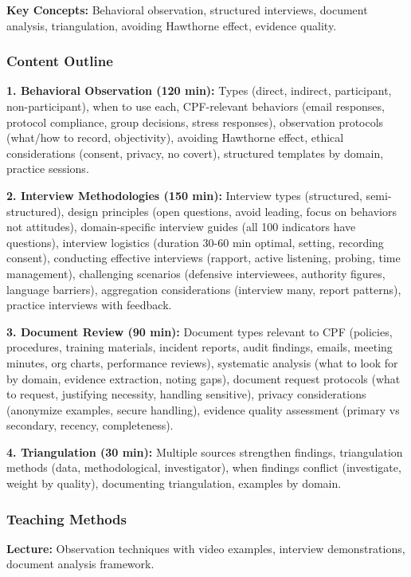 \documentclass[11pt,a4paper]{article}
\begin{document}
\textbf{Key Concepts:} Behavioral observation, structured interviews, document analysis, triangulation, avoiding Hawthorne effect, evidence quality.

\subsubsection{Content Outline}

\textbf{1. Behavioral Observation (120 min):} Types (direct, indirect, participant, non-participant), when to use each, CPF-relevant behaviors (email responses, protocol compliance, group decisions, stress responses), observation protocols (what/how to record, objectivity), avoiding Hawthorne effect, ethical considerations (consent, privacy, no covert), structured templates by domain, practice sessions.

\textbf{2. Interview Methodologies (150 min):} Interview types (structured, semi-structured), design principles (open questions, avoid leading, focus on behaviors not attitudes), domain-specific interview guides (all 100 indicators have questions), interview logistics (duration 30-60 min optimal, setting, recording consent), conducting effective interviews (rapport, active listening, probing, time management), challenging scenarios (defensive interviewees, authority figures, language barriers), aggregation considerations (interview many, report patterns), practice interviews with feedback.

\textbf{3. Document Review (90 min):} Document types relevant to CPF (policies, procedures, training materials, incident reports, audit findings, emails, meeting minutes, org charts, performance reviews), systematic analysis (what to look for by domain, evidence extraction, noting gaps), document request protocols (what to request, justifying necessity, handling sensitive), privacy considerations (anonymize examples, secure handling), evidence quality assessment (primary vs secondary, recency, completeness).

\textbf{4. Triangulation (30 min):} Multiple sources strengthen findings, triangulation methods (data, methodological, investigator), when findings conflict (investigate, weight by quality), documenting triangulation, examples by domain.

\subsubsection{Teaching Methods}

\textbf{Lecture:} Observation techniques with video examples, interview demonstrations, document analysis framework.
\end{document}
